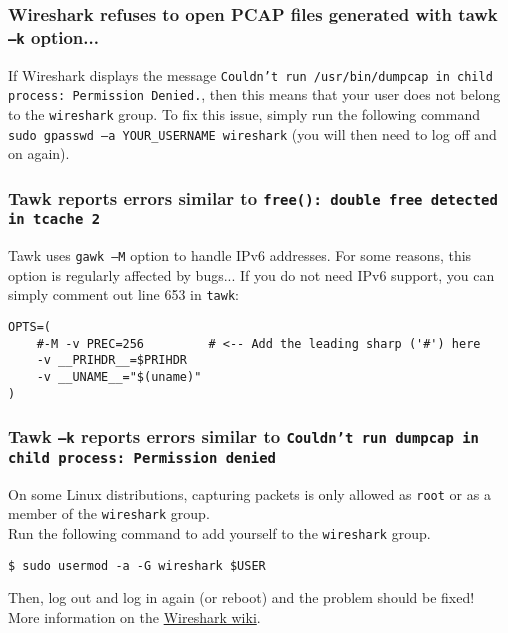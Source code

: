 \documentclass[documentation]{subfiles}
\begin{document}
\subsubsection{Wireshark refuses to open PCAP files generated with tawk {\tt--k} option...}
If Wireshark displays the message {\tt Couldn't run /usr/bin/dumpcap in child process: Permission Denied.}, then this means that your user does not belong to the {\tt wireshark} group.
To fix this issue, simply run the following command {\tt sudo gpasswd --a YOUR\_USERNAME wireshark} (you will then need to log off and on again).

\subsubsection{Tawk reports errors similar to {\tt free():\ double free detected in tcache 2}}
Tawk uses {\tt gawk --M} option to handle IPv6 addresses. For some reasons, this option is regularly affected by bugs... If you do not need IPv6 support, you can simply comment out line 653 in {\tt tawk}:

\begin{verbatim}
OPTS=(
    #-M -v PREC=256         # <-- Add the leading sharp ('#') here
    -v __PRIHDR__=$PRIHDR
    -v __UNAME__="$(uname)"
)
\end{verbatim}

\subsubsection{Tawk {\tt --k} reports errors similar to {\tt Couldn't run dumpcap in child process: Permission denied}}

On some Linux distributions, capturing packets is only allowed as {\tt root} or as a member of the {\tt wireshark} group.\\

\noindent
Run the following command to add yourself to the {\tt wireshark} group.

\begin{verbatim}
$ sudo usermod -a -G wireshark $USER
\end{verbatim}

\noindent
Then, log out and log in again (or reboot) and the problem should be fixed!\\

\noindent
More information on the \href{https://wiki.wireshark.org/CaptureSetup/CapturePrivileges}{Wireshark wiki}.
\end{document}
